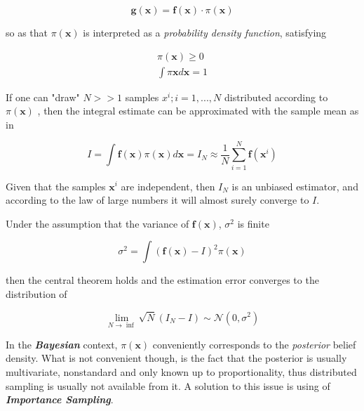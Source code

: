 \begin{equation}
\label{eq:MCIfact}\mathbf{g(x)} = \mathbf{f(x)} \cdot \pi(\mathbf{x}) 
\end{equation}


so  as that $\pi(\mathbf{x})$ is interpreted as a \emph{probability density function}, satisfying 

\begin{equation}\label{eq:MCI2}
\begin{aligned}
\pi(\mathbf{x}) \geq 0 \\
\int \pi \mathbf{x} d \mathbf{x} = 1
\end{aligned}
\end{equation}




If one can "draw" $N >> 1$ samples ${x^i; i = 1,...,N}$ distributed according to $\pi (\mathbf{x})$ , then the integral estimate can be approximated with the sample mean as in  

\begin{equation}\label{eq:MCI3}
I = \int \mathbf{f}(\mathbf{x})\pi(\mathbf{x}) d\mathbf{x} = I_N \approx \frac{1}{N}\sum_{i=1}^{N} \mathbf{f}(\mathbf{x}^i)
\end{equation}


Given that the samples $\mathbf{x}^i$ are independent, then $I_N$ is an unbiased estimator, and according to the law of large numbers it will almost surely converge to $I$.


Under the assumption that the variance of $\mathbf{f}(\mathbf{x})$, $\sigma^2$ is finite

\[ \sigma^2 = \int (\mathbf{f}(\mathbf{x})- I)^2 \pi(\mathbf{x}) \]


then the central theorem holds and the estimation error converges to the distribution of 

\begin{equation}\label{eq:MCI4}
\lim_{N\rightarrow \inf} \sqrt{N}(I_N - I) \sim \mathcal{N}(0,
\sigma^2)
\end{equation}


In the \textbf{\emph{Bayesian}} context, $\pi(\mathbf{x})$ conveniently corresponds to the \emph{posterior} belief density. What is not convenient though, is the fact that the posterior is usually multivariate, nonstandard and only known up to proportionality, thus distributed sampling is usually not available from it. A solution to this issue is using of \emph{\textbf{Importance Sampling}}.

